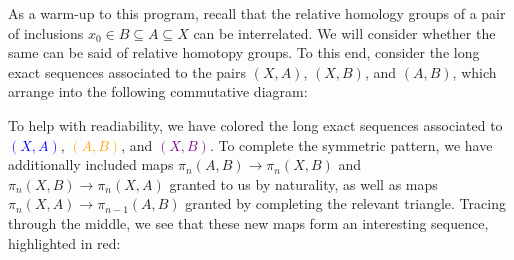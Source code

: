 As a warm-up to this program, recall that the relative homology groups of a pair of inclusions $x_0 \in B \subseteq A \subseteq X$ can be interrelated.
We will consider whether the same can be said of relative homotopy groups.
To this end, consider the long exact sequences associated to the pairs $(X, A)$, $(X, B)$, and $(A, B)$, which arrange into the following commutative diagram:
\begin{figure*}
\begin{center}
\end{center}
\end{figure*}
To help with readiability, we have colored the long exact sequences associated to \textcolor{blue}{$(X, A)$}, \textcolor{orange}{$(A, B)$}, and \textcolor{purple}{$(X, B)$}.
To complete the symmetric pattern, we have additionally included maps $\pi_n(A, B) \to \pi_n(X, B)$ and $\pi_n(X, B) \to \pi_n(X, A)$ granted to us by naturality, as well as maps $\pi_n(X, A) \to \pi_{n-1}(A, B)$ granted by completing the relevant triangle.
Tracing through the middle, we see that these new maps form an interesting sequence, highlighted in red:
\begin{figure*}
\begin{center}
\end{center}
\end{figure*}

